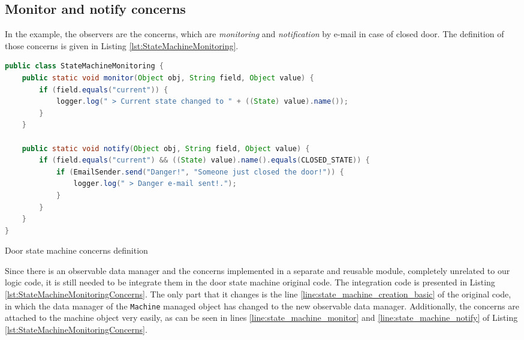 \subsection{Monitor and notify concerns}
In the example, the observers are the concerns, which are \textit{monitoring} and \textit{notification} by e-mail in case of closed door. 
The definition of those concerns is given in Listing \ref{lst:StateMachineMonitoring}.

\begin{sourcecode} [H]
	\begin{lstlisting}[language=Java, escapechar=|]
public class StateMachineMonitoring {
    public static void monitor(Object obj, String field, Object value) {
        if (field.equals("current")) {
            logger.log(" > Current state changed to " + ((State) value).name());
        }
    }

    public static void notify(Object obj, String field, Object value) {
        if (field.equals("current") && ((State) value).name().equals(CLOSED_STATE)) {
            if (EmailSender.send("Danger!", "Someone just closed the door!")) {
            	logger.log(" > Danger e-mail sent!.");
            }
        }
    }
}
	\end{lstlisting}
	\caption{Door state machine concerns definition}
	\label{lst:StateMachineMonitoring}
\end{sourcecode}

Since there is an observable data manager and the concerns implemented in a separate and reusable module, completely unrelated to our logic code, it is still needed to be integrate them in the door state machine original code.
The integration code is presented in Listing \ref{lst:StateMachineMonitoringConcerns}.
The only part that it changes is the line \ref{line:state_machine_creation_basic} of the original code, in which the data manager of the \texttt{Machine} managed object has changed to the new observable data manager.
Additionally, the concerns are attached to the machine object very easily, as can be seen in lines \ref{line:state_machine_monitor} and \ref{line:state_machine_notify} of Listing \ref{lst:StateMachineMonitoringConcerns}.


